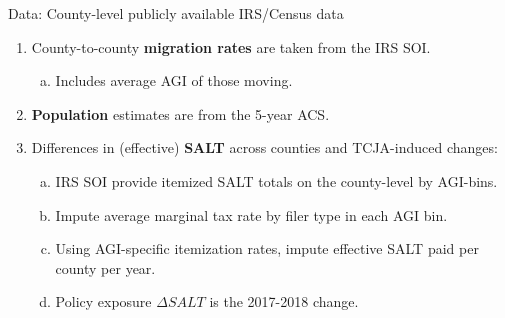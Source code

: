 \documentclass[10pt, aspectratio=169]{beamer}
\begin{document}
\begin{frame}{Data: County-level publicly available IRS/Census data}
    \begin{enumerate}
        \item County-to-county \textbf{migration rates} are taken from the IRS SOI. 
        \begin{enumerate}[a)]
            \item Includes average AGI of those moving.
        \end{enumerate}
        \item \textbf{Population} estimates are from the 5-year ACS.
        \item Differences in (effective) \textbf{SALT} across counties and TCJA-induced changes:
        \begin{enumerate}[a)]
            \item IRS SOI provide itemized SALT totals on the county-level by AGI-bins.
            \item Impute average marginal tax rate by filer type in each AGI bin.
            \item Using AGI-specific itemization rates, impute effective SALT paid per county per year.
            \item Policy exposure \alert{$\Delta SALT$} is the 2017-2018 change.
        \end{enumerate}
    \end{enumerate}
\end{frame}
\end{document}
